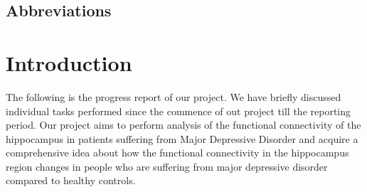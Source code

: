 \documentclass[12pt]{article}
\begin{document}
\newpage

\thispagestyle{empty}
\listoffigures



\begin{center}
  \section*{Abbreviations}
\end{center}

\begin{acronym}
\end{acronym}

\newpage

\begingroup
  \fontsize{12pt}{12pt}\selectfont

\vskip -10pt
\enlargethispage{\baselineskip}
\thispagestyle{empty}
\addcontentsline{}{}{}
\tableofcontents

\endgroup
\newpage

\clearpage
\setcounter{page}{1}

\section{Introduction}

The following is the progress report of our project. We have briefly discussed
individual tasks performed since the commence of out project till the reporting
period. Our project aims to perform analysis of the functional connectivity of
the hippocampus in patients suffering from Major Depressive Disorder and
acquire a comprehensive idea about how the functional connectivity in the
hippocampus region changes in people who are suffering from major depressive
disorder compared to healthy controls.
\end{document}
